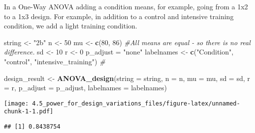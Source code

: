 \documentclass[]{article}
\newenvironment{Shaded}{\begin{snugshade}}{\end{snugshade}}
\newcommand{\KeywordTok}[1]{\textcolor[rgb]{0.13,0.29,0.53}{\textbf{#1}}}
\newcommand{\DataTypeTok}[1]{\textcolor[rgb]{0.13,0.29,0.53}{#1}}
\newcommand{\DecValTok}[1]{\textcolor[rgb]{0.00,0.00,0.81}{#1}}
\newcommand{\StringTok}[1]{\textcolor[rgb]{0.31,0.60,0.02}{#1}}
\newcommand{\CommentTok}[1]{\textcolor[rgb]{0.56,0.35,0.01}{\textit{#1}}}
\newcommand{\OperatorTok}[1]{\textcolor[rgb]{0.81,0.36,0.00}{\textbf{#1}}}
\newcommand{\NormalTok}[1]{#1}
\begin{document}
In a One-Way ANOVA adding a condition means, for example, going from a
1x2 to a 1x3 design. For example, in addition to a control and intensive
training condition, we add a light training condition.

\begin{Shaded}
\begin{Highlighting}[]
\NormalTok{string <-}\StringTok{ "2b"}
\NormalTok{n <-}\StringTok{ }\DecValTok{50}
\NormalTok{mu <-}\StringTok{ }\KeywordTok{c}\NormalTok{(}\DecValTok{80}\NormalTok{, }\DecValTok{86}\NormalTok{) }\CommentTok{#All means are equal - so there is no real difference.}
\NormalTok{sd <-}\StringTok{ }\DecValTok{10}
\NormalTok{r <-}\StringTok{ }\DecValTok{0} 
\NormalTok{p_adjust =}\StringTok{ "none"}
\NormalTok{labelnames <-}\StringTok{ }\KeywordTok{c}\NormalTok{(}\StringTok{"Condition"}\NormalTok{, }\StringTok{"control"}\NormalTok{, }\StringTok{"intensive_training"}\NormalTok{) }\CommentTok{#}

\NormalTok{design_result <-}\StringTok{ }\KeywordTok{ANOVA_design}\NormalTok{(}\DataTypeTok{string =}\NormalTok{ string,}
                   \DataTypeTok{n =}\NormalTok{ n, }
                   \DataTypeTok{mu =}\NormalTok{ mu, }
                   \DataTypeTok{sd =}\NormalTok{ sd, }
                   \DataTypeTok{r =}\NormalTok{ r, }
                   \DataTypeTok{p_adjust =}\NormalTok{ p_adjust,}
                   \DataTypeTok{labelnames =}\NormalTok{ labelnames)}
\end{Highlighting}
\end{Shaded}

\texttt{[image: 4.5\_power\_for\_design\_variations\_files/figure-latex/unnamed-chunk-1-1.pdf]}

\begin{Shaded}
\end{Shaded}

\begin{verbatim}
## [1] 0.8438754
\end{verbatim}

\begin{Shaded}
\end{Shaded}
\end{document}

